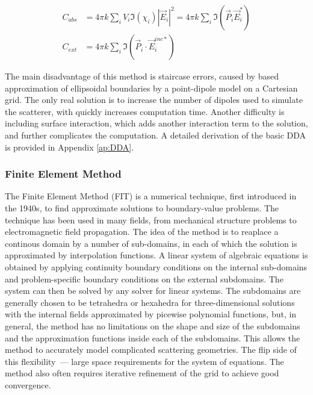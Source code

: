             \begin{align}
                C_{abs} &= 4\pi k \sum_i V_i \Im(\chi_i)|\vec{E}_i|^2 = 4\pi k \sum_i \Im(\vec{P}_i\vec{E}_i^*) \\
                C_{ext} &= 4\pi k \sum_i \Im (\vec{P}_i\cdot\vec{E}_i^{inc*})
            \end{align}

                The main disadvantage of this method is staircase errors, caused by based approximation of ellipsoidal boundaries by a point-dipole
            model on a Cartesian grid. The only real solution is to increase the number of dipoles used to simulate the scatterer, with quickly increases
            computation time. Another difficulty is including surface interaction, which adds another interaction term to the solution, and further
            complicates the computation. A detailed derivation of the basic DDA is provided in Appendix \ref{ap:DDA}.

        \subsubsection{Finite Element Method}
                The Finite Element Method (FIT) is a numerical technique, first introduced in the 1940s\cite{courant1994variational}, to
            find approximate solutions to boundary-value problems. The technique has been used in many fields, from mechanical structure
            problems to electromagnetic field propagation.
                The idea of the method is to reaplace a continous domain by a number of sub-domains, in each of which the solution is
            approximated by interpolation functions. A linear system of algebraic equations is obtained by applying continuity boundary conditions
            on the internal sub-domains and problem-specific boundary conditions on the external subdomains. The system can then be solved
            by any solver for linear systems. The subdomains are generally chosen to be tetrahedra or hexahedra for three-dimensional solutions
            with the internal fields approximated by picewise polynomial functions, but, in general, the method has no limitations on the
            shape and size of the subdomains and the approximation functions inside each of the subdomains. This allows the method
            to accurately model complicated scattering geometries. The flip side of this flexibility~--- large space requirements for
            the system of equations. The method also often requires iterative refinement of the grid to achieve good convergence.

